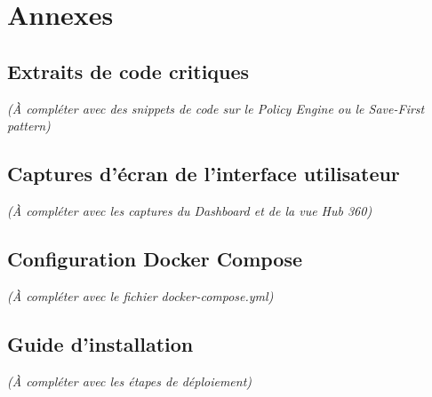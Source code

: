 \chapter*{Annexes}

\section{Extraits de code critiques}
\textit{(À compléter avec des snippets de code sur le Policy Engine ou le Save-First pattern)}

\section{Captures d'écran de l'interface utilisateur}
\textit{(À compléter avec les captures du Dashboard et de la vue Hub 360)}

\section{Configuration Docker Compose}
\textit{(À compléter avec le fichier docker-compose.yml)}

\section{Guide d'installation}
\textit{(À compléter avec les étapes de déploiement)}
